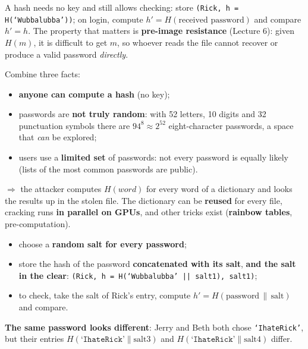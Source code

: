 \begin{defnbox}[title={Option 2: store a hash of the password --- still not enough}]
A hash needs no key and still allows checking: store \texttt{(Rick, h = H(`Wubbalubba'))}; on
login, compute $h' = H(\text{received password})$ and compare $h' = h$. The property that matters
is \textbf{pre-image resistance} (Lecture 6): given $H(m)$, it is difficult to get $m$, so whoever
reads the file cannot recover or produce a valid password \emph{directly}.
\end{defnbox}

\begin{warnbox}[title={Offline attacks: the dictionary attack}]
Combine three facts:
\begin{itemize}
  \item \textbf{anyone can compute a hash} (no key);
  \item passwords are \textbf{not truly random}: with 52 letters, 10 digits and 32 punctuation
        symbols there are $94^8 \approx 2^{52}$ eight-character passwords, a space that \emph{can}
        be explored;
  \item users use a \textbf{limited set} of passwords: not every password is equally likely
        (lists of the most common passwords are public).
\end{itemize}
$\Rightarrow$ the attacker computes $H(\textit{word})$ for every word of a dictionary and looks the
results up in the stolen file. The dictionary can be \textbf{reused} for every file, cracking runs
\textbf{in parallel on GPUs}, and other tricks exist (\textbf{rainbow tables}, pre-computation).
\end{warnbox}

\begin{defnbox}[title={Option 3: hash + salt --- do this (with a library)}]
\begin{itemize}
  \item choose a \textbf{random salt for every password};
  \item store the hash of the password \textbf{concatenated with its salt}, \textbf{and the salt in
        the clear}: \texttt{(Rick, h = H(`Wubbalubba' || salt1), salt1)};
  \item to check, take the salt of Rick's entry, compute $h' = H(\text{password} \,\|\,
        \text{salt})$ and compare.
\end{itemize}
\textbf{The same password looks different}: Jerry and Beth both chose \texttt{`IhateRick'}, but
their entries $H(\texttt{`IhateRick'}\|\text{salt3})$ and $H(\texttt{`IhateRick'}\|\text{salt4})$
differ.
\end{defnbox}

